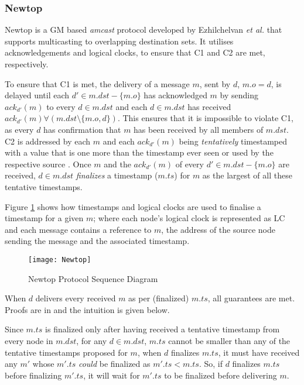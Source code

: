         \subsubsection*{Newtop} \label{ssec:newtop}
        Newtop\citep{Ezhilchelvan:1995:NFG:876885.880005} is a GM based \emph{amcast} protocol developed by Ezhilchelvan \emph{et al.} that supports multicasting to overlapping destination sets.  It utilises acknowledgements and logical clocks, to ensure that C1 and C2 are met, respectively.  
        
        To ensure that C1 is met, the delivery of a message $m$, sent by $d$, $m.o=d$, is delayed until each $d' \in m.dst-\{m.o\}$ has acknowledged $m$ by sending $ack_{d'}(m)$ to every $d \in m.dst$ and each $d \in m.dst$ has received $ack_{d'}(m) \forall (m.dst \setminus \{m.o,d\})$.  This ensures that it is impossible to violate C1, as every $d$ has confirmation that $m$ has been received by all members of $m.dst$.
        C2 is addressed by each $m$ and each $ack_{d'}(m)$ being \emph{tentatively} timestamped with a value that is one more than the timestamp ever seen or used by the respective source \cite{Lamport:1978:TCO:359545.359563}. Once $m$ and the $ack_{d'}(m)$ of every $d'\in m.dst-\{m.o\}$ are received, $d \in m.dst$ \emph{finalizes} a timestamp ($m.ts$) for $m$ as the largest of all these tentative timestamps. 
        
        Figure \ref{fig:newtop} shows how timestamps and logical clocks are used to finalise a timestamp for a given $m$; where each node's logical clock is represented as LC and each message contains a reference to $m$, the address of the source node sending the message and the associated timestamp.  

    \begin{figure}[htbp!] 
                \centering    
                \texttt{[image: Newtop]}
                \caption[Newtop Atomic Multicast Protocol]{Newtop Protocol Sequence Diagram}
                \label{fig:newtop}
            \end{figure}	          
        
        When $d$ delivers every received $m$ as per (finalized) $m.ts$, all guarantees are met. Proofs are in \cite{Lamport:1978:TCO:359545.359563, Birman:1991:LCA:128738.128742, Ezhilchelvan:1995:NFG:876885.880005} and the intuition is given below.
        
        Since $m.ts$ is finalized only after having received a tentative timestamp from every node in $m.dst$, for any $d \in m.dst$, $m.ts$ cannot be smaller than any of the tentative timestamps proposed for $m$, when $d$ finalizes $m.ts$, it must have received any $m'$ whose $m'.ts$ \emph{could} be finalized as $m'.ts < m.ts$. So, if $d$ finalizes $m.ts$ before finalizing $m'.ts$, it will wait for $m'.ts$ to be finalized before delivering $m$.
        
